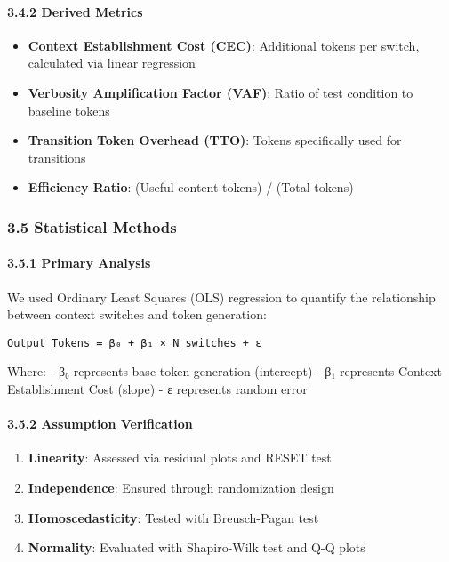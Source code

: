 \documentclass[
  11pt]{article}
\providecommand{\tightlist}{%
  \setlength{\itemsep}{0pt}\setlength{\parskip}{0pt}}
\begin{document}
\paragraph{3.4.2 Derived Metrics}\label{derived-metrics}

\begin{itemize}
\tightlist
\item
  \textbf{Context Establishment Cost (CEC)}: Additional tokens per
  switch, calculated via linear regression
\item
  \textbf{Verbosity Amplification Factor (VAF)}: Ratio of test condition
  to baseline tokens
\item
  \textbf{Transition Token Overhead (TTO)}: Tokens specifically used for
  transitions
\item
  \textbf{Efficiency Ratio}: (Useful content tokens) / (Total tokens)
\end{itemize}

\subsubsection{3.5 Statistical Methods}\label{statistical-methods}

\paragraph{3.5.1 Primary Analysis}\label{primary-analysis}

We used Ordinary Least Squares (OLS) regression to quantify the
relationship between context switches and token generation:

\begin{verbatim}
Output_Tokens = β₀ + β₁ × N_switches + ε
\end{verbatim}

Where: - β₀ represents base token generation (intercept) - β₁ represents
Context Establishment Cost (slope) - ε represents random error

\paragraph{3.5.2 Assumption Verification}\label{assumption-verification}

\begin{enumerate}
\def\labelenumi{\arabic{enumi}.}
\tightlist
\item
  \textbf{Linearity}: Assessed via residual plots and RESET test
\item
  \textbf{Independence}: Ensured through randomization design
\item
  \textbf{Homoscedasticity}: Tested with Breusch-Pagan test
\item
  \textbf{Normality}: Evaluated with Shapiro-Wilk test and Q-Q plots
\end{enumerate}
\end{document}
